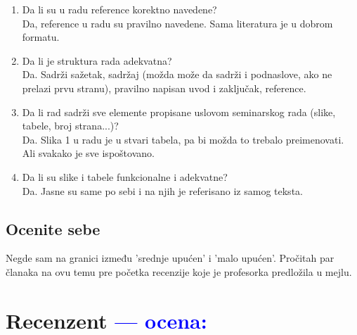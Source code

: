 \documentclass[a4paper]{report}
\newcommand{\odgovor}[1]{\textcolor{blue}{#1}}
\begin{document}
\begin{enumerate}
\item Da li su u radu reference korektno navedene?\\
Da, reference u radu su pravilno navedene. Sama literatura je u dobrom formatu.

\item Da li je struktura rada adekvatna?\\
Da. Sadrži sažetak, sadržaj (možda može da sadrži i podnaslove, ako ne prelazi prvu stranu), pravilno napisan uvod i zaključak, reference.

\item Da li rad sadrži sve elemente propisane uslovom seminarskog rada (slike, tabele, broj strana...)?\\
Da. Slika 1 u radu je u stvari tabela, pa bi možda to trebalo preimenovati. Ali svakako je sve ispoštovano.

\item Da li su slike i tabele funkcionalne i adekvatne?\\
Da. Jasne su same po sebi i na njih je referisano iz samog teksta.
\end{enumerate}

\section{Ocenite sebe}
Negde sam na granici između 'srednje upućen' i 'malo upućen'. Pročitah par članaka na ovu temu pre početka recenzije koje je profesorka predložila u mejlu.


\chapter{Recenzent \odgovor{--- ocena:} }
\end{document}
